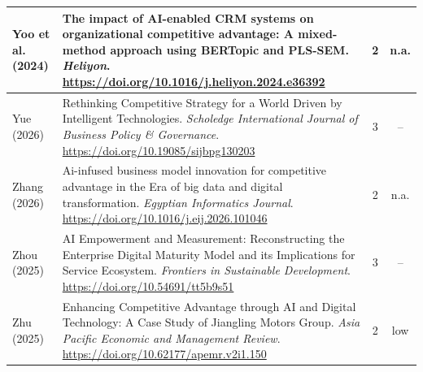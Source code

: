 {\begin{longtable}{|>{\raggedright\arraybackslash}p{2.6cm}|>{\raggedright\arraybackslash}p{10.2cm}|c|c|}
Yoo et al. (2024) & The impact of AI-enabled CRM systems on organizational competitive advantage: A mixed-method approach using BERTopic and PLS-SEM. \textit{Heliyon}. \url{https://doi.org/10.1016/j.heliyon.2024.e36392} & 2 & n.a. \\ \hline
Yue (2026) & Rethinking Competitive Strategy for a World Driven by Intelligent Technologies. \textit{Scholedge International Journal of Business Policy \& Governance}. \url{https://doi.org/10.19085/sijbpg130203} & 3 & -- \\ \hline
Zhang (2026) & Ai-infused business model innovation for competitive advantage in the Era of big data and digital transformation. \textit{Egyptian Informatics Journal}. \url{https://doi.org/10.1016/j.eij.2026.101046} & 2 & n.a. \\ \hline
Zhou (2025) & AI Empowerment and Measurement: Reconstructing the Enterprise Digital Maturity Model and its Implications for Service Ecosystem. \textit{Frontiers in Sustainable Development}. \url{https://doi.org/10.54691/tt5b9s51} & 3 & -- \\ \hline
Zhu (2025) & Enhancing Competitive Advantage through AI and Digital Technology: A Case Study of Jiangling Motors Group. \textit{Asia Pacific Economic and Management Review}. \url{https://doi.org/10.62177/apemr.v2i1.150} & 2 & low \\
\end{longtable}
\vspace{-0.8\baselineskip}
\par}
